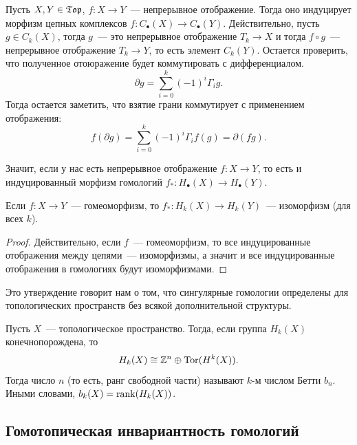     \begin{remark}
       Пусть $X, Y \in \mathfrak{T}\mathfrak{o}\mathfrak{p}$, $f\colon X \to Y$~--- непрерывное отображение. Тогда оно индуцирует морфизм
       цепных комплексов $f\colon C_{\bullet}(X) \to C_{\bullet}(Y)$. Действительно, пусть $g \in C_{k}(X)$, тогда $g$~--- это
       непрерывное отображение $T_{k} \to X$ и тогда $f \circ g$~--- непрерывное отображение $T_{k} \to Y$, то есть элемент $C_{k}(Y)$.
       Остается проверить, что полученное отоюражение будет коммутировать с дифференциалом.
       \[ \partial g = \sum_{i = 0}^{k} (-1)^{i} \Gamma_{i}g. \]
       Тогда остается заметить, что взятие грани коммутирует с применением отображения:
       \[ f(\partial{g}) = \sum_{i = 0}^{k} (-1)^{i} \Gamma_{i}f(g) = \partial(f g).   \]

        Значит, если у нас есть непрерывное отображение $f\colon X \to Y$, то есть и индуцированный морфизм гомологий $f_{*}\colon H_{\bullet}(X) \to H_{\bullet}(Y)$.
    \end{remark}   
    
    \begin{statement}
        Если $f\colon X \to Y$~--- гомеоморфизм, то $f_{*}\colon H_{k}(X) \to H_{k}(Y)$~--- изоморфизм (для всех $k$). 
    \end{statement}
    \begin{proof}
        Действительно, если $f$~--- гомеоморфизм, то все индуцированные отображения между цепями~--- изоморфизмы, а значит и все индуцированные отображения в гомологиях
        будут изоморфизмами.
    \end{proof}
    \begin{remark}
       Это утверждение говорит нам о том, что сингулярные гомологии определены для топологических пространств без всякой дополнительной структуры.
    \end{remark}

    \begin{definition}
        Пусть $X$~--- топологическое пространство. Тогда, если группа  $H_{k}(X)$ конечнопорождена, то
        \[ H_{k}(X) \cong \mathbb{Z}^{n} \oplus \mathrm{Tor}(H^{k}(X)). \]
        Тогда число $n$ (то есть, ранг свободной части) называют $k$-м числом Бетти $b_n$. Иными словами, $b_{k}(X) = \operatorname{rank}(H_{k}(X))$.
    \end{definition}

    
    \subsection{Гомотопическая инвариантность гомологий}

